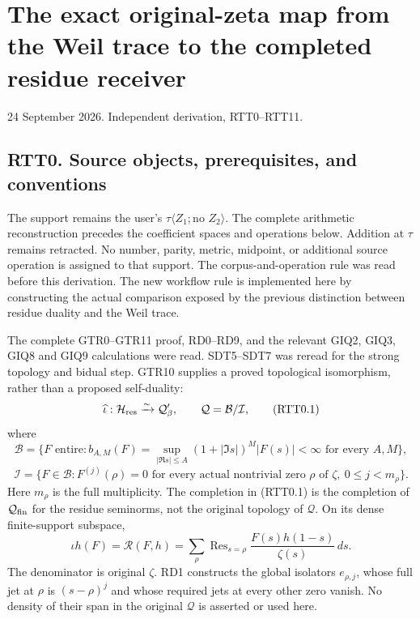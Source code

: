 \section{The exact original-zeta map from the Weil trace to the
completed residue
receiver}\label{the-exact-original-zeta-map-from-the-weil-trace-to-the-completed-residue-receiver}

24 September 2026. Independent derivation, RTT0--RTT11.

\subsection{RTT0. Source objects, prerequisites, and
conventions}\label{rtt0.-source-objects-prerequisites-and-conventions}

The support remains the user's \(\tau\langle Z_1;\text{no }Z_2\rangle\).
The complete arithmetic reconstruction precedes the coefficient spaces
and operations below. Addition at \(\tau\) remains retracted. No number,
parity, metric, midpoint, or additional source operation is assigned to
that support. The corpus-and-operation rule was read before this
derivation. The new workflow rule is implemented here by constructing
the actual comparison exposed by the previous distinction between
residue duality and the Weil trace.

The complete GTR0--GTR11 proof, RD0--RD9, and the relevant GIQ2, GIQ3,
GIQ8 and GIQ9 calculations were read. SDT5--SDT7 was reread for the
strong topology and bidual step. GTR10 supplies a proved topological
isomorphism, rather than a proposed self-duality: \[
\widehat\iota:\mathcal H_{\rm res}\xrightarrow{\sim}\mathcal Q'_\beta,
\qquad \mathcal Q=\mathcal B/\mathcal I,
\tag{RTT0.1}
\] where \[
\mathcal B=\{F\text{ entire}:b_{A,M}(F)=\sup_{|\Re s|\le A}
(1+|\Im s|)^M|F(s)|<\infty\text{ for every }A,M\},
\] \[
\mathcal I=\{F\in\mathcal B:F^{(j)}(\rho)=0
\text{ for every actual nontrivial zero }\rho\text{ of }\zeta,
\ 0\le j<m_\rho\}.
\tag{RTT0.2}
\] Here \(m_\rho\) is the full multiplicity. The completion in (RTT0.1)
is the completion of \(\mathcal Q_{\rm fin}\) for the residue seminorms,
not the original topology of \(\mathcal Q\). On its dense finite-support
subspace, \[
\iota h(F)=\mathcal R(F,h)
=\sum_\rho\operatorname{Res}_{s=\rho}
\frac{F(s)h(1-s)}{\zeta(s)}\,ds.
\tag{RTT0.3}
\] The denominator is original \(\zeta\). RD1 constructs the global
isolators \(e_{\rho,j}\), whose full jet at \(\rho\) is \((s-\rho)^j\)
and whose required jets at every other zero vanish. No density of their
span in the original \(\mathcal Q\) is asserted or used here.

